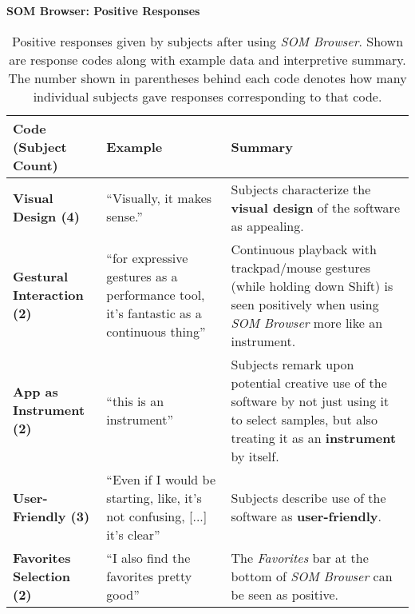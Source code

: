 \begin{table}[!htb]
  \renewcommand{\arraystretch}{1.2}
  \centering
  \textbf{SOM Browser: Positive Responses} \\ [3mm]
  \footnotesize
  \colorbox{light-bg}{
  \begin{tabular}{ p{4.0cm} p{4.75cm} p{4.75cm} }
  \hline
    \textbf{Code (Subject Count)} & \textbf{Example} & \textbf{Summary} \\
    \hline
    \textbf{Visual Design (4)}
    &
    ``Visually, it makes sense.''
    &
    Subjects characterize the \textbf{visual design} of the software as
    appealing.
    \\
    \textbf{Gestural Interaction (2)}
    &
    ``for expressive gestures as a performance tool, it’s fantastic as a
    continuous thing''
    &
    Continuous playback with trackpad/mouse gestures (while holding down Shift)
    is seen positively when using \textit{SOM Browser} more like an instrument.
    \\
    \textbf{App as Instrument (2)}
    &
    ``this is an instrument''
    &
    Subjects remark upon potential creative use of the software by not just
    using it to select samples, but also treating it as an \textbf{instrument}
    by itself.
    \\
    \textbf{User-Friendly (3)}
    &
    ``Even if I would be starting, like, it's not confusing, [...] it’s clear''
    &
    Subjects describe use of the software as \textbf{user-friendly}.
    \\
    \textbf{Favorites Selection (2)}
    &
    ``I also find the favorites pretty good''
    &
    The \textit{Favorites} bar at the bottom of \textit{SOM Browser} can be seen
    as positive.
    \\
  \end{tabular}}
  \caption[\textit{SOM Browser}: Positive Responses]{Positive responses given
  by subjects after using \textit{SOM Browser}. Shown are response codes along
  with example data and interpretive summary. The number shown in parentheses
  behind each code denotes how many individual subjects gave responses
  corresponding to that code.}
  \label{table:responses_som-browser_positive}
\end{table}

